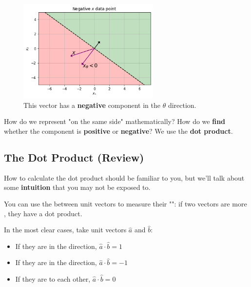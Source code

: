         \begin{figure}[H]
            \centering
                \includegraphics[width=70mm,scale=0.5]{images/classification_images/negative_v_vector.png}
                
                \caption*{This vector has a \textbf{negative} component in the $\theta$ direction.}
        \end{figure}
            
        How do we represent "on the same side" mathematically? How do we \textbf{find} whether the component is \textbf{positive} or \textbf{negative}? We use the \textbf{dot product}.\\
        
    \subsection*{The Dot Product (Review)}
    
        How to calculate the dot product should be familiar to you, but we'll talk about some \textbf{intuition} that you may not be exposed to.\\
        
        \begin{concept}
            You can use the  between unit vectors to measure their "": if two vectors are more , they have a  dot product.
            
            In the most clear cases, take unit vectors $\hat{a}$ and $\hat{b}$:
            
            \begin{itemize} 
                \item If they are in the  direction, $\hat{a} \cdot \hat{b} = 1$
                
                \item If they are in the  direction, $\hat{a} \cdot \hat{b} = -1$
                
                \item If they are  to each other, $\hat{a} \cdot \hat{b} = 0$
            \end{itemize}
        \end{concept}
        
